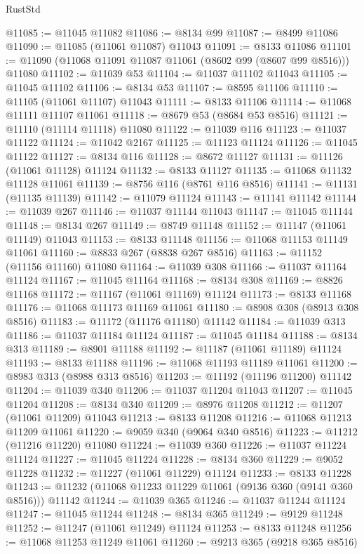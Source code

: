 \begin{lexlean}{RustStd}
\begin{coremodule}
@11085 := @11045 @11082
@11086 := @8134 @99
@11087 := @8499 @11086
@11090 := @11085 (@11061 @11087) @11043
@11091 := @8133 @11086
@11101 := @11090 (@11068 @11091 @11087 @11061 (@8602 @99 (@8607 @99 @8516))) @11080
@11102 := @11039 @53
@11104 := @11037 @11102 @11043
@11105 := @11045 @11102
@11106 := @8134 @53
@11107 := @8595 @11106
@11110 := @11105 (@11061 @11107) @11043
@11111 := @8133 @11106
@11114 := @11068 @11111 @11107 @11061
@11118 := @8679 @53 (@8684 @53 @8516)
@11121 := @11110 (@11114 @11118) @11080
@11122 := @11039 @116
@11123 := @11037 @11122
@11124 := @11042 @2167
@11125 := @11123 @11124
@11126 := @11045 @11122
@11127 := @8134 @116
@11128 := @8672 @11127
@11131 := @11126 (@11061 @11128) @11124
@11132 := @8133 @11127
@11135 := @11068 @11132 @11128 @11061
@11139 := @8756 @116 (@8761 @116 @8516)
@11141 := @11131 (@11135 @11139)
@11142 := @11079 @11124
@11143 := @11141 @11142
@11144 := @11039 @267
@11146 := @11037 @11144 @11043
@11147 := @11045 @11144
@11148 := @8134 @267
@11149 := @8749 @11148
@11152 := @11147 (@11061 @11149) @11043
@11153 := @8133 @11148
@11156 := @11068 @11153 @11149 @11061
@11160 := @8833 @267 (@8838 @267 @8516)
@11163 := @11152 (@11156 @11160) @11080
@11164 := @11039 @308
@11166 := @11037 @11164 @11124
@11167 := @11045 @11164
@11168 := @8134 @308
@11169 := @8826 @11168
@11172 := @11167 (@11061 @11169) @11124
@11173 := @8133 @11168
@11176 := @11068 @11173 @11169 @11061
@11180 := @8908 @308 (@8913 @308 @8516)
@11183 := @11172 (@11176 @11180) @11142
@11184 := @11039 @313
@11186 := @11037 @11184 @11124
@11187 := @11045 @11184
@11188 := @8134 @313
@11189 := @8901 @11188
@11192 := @11187 (@11061 @11189) @11124
@11193 := @8133 @11188
@11196 := @11068 @11193 @11189 @11061
@11200 := @8983 @313 (@8988 @313 @8516)
@11203 := @11192 (@11196 @11200) @11142
@11204 := @11039 @340
@11206 := @11037 @11204 @11043
@11207 := @11045 @11204
@11208 := @8134 @340
@11209 := @8976 @11208
@11212 := @11207 (@11061 @11209) @11043
@11213 := @8133 @11208
@11216 := @11068 @11213 @11209 @11061
@11220 := @9059 @340 (@9064 @340 @8516)
@11223 := @11212 (@11216 @11220) @11080
@11224 := @11039 @360
@11226 := @11037 @11224 @11124
@11227 := @11045 @11224
@11228 := @8134 @360
@11229 := @9052 @11228
@11232 := @11227 (@11061 @11229) @11124
@11233 := @8133 @11228
@11243 := @11232 (@11068 @11233 @11229 @11061 (@9136 @360 (@9141 @360 @8516))) @11142
@11244 := @11039 @365
@11246 := @11037 @11244 @11124
@11247 := @11045 @11244
@11248 := @8134 @365
@11249 := @9129 @11248
@11252 := @11247 (@11061 @11249) @11124
@11253 := @8133 @11248
@11256 := @11068 @11253 @11249 @11061
@11260 := @9213 @365 (@9218 @365 @8516)

\end{coremodule}
\end{lexlean}
